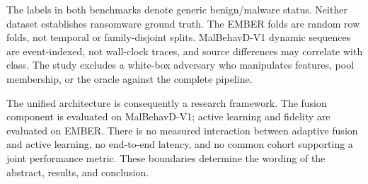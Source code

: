 The labels in both benchmarks denote generic benign/malware status. Neither
dataset establishes ransomware ground truth. The EMBER folds are random row
folds, not temporal or family-disjoint splits. MalBehavD-V1 dynamic sequences are
event-indexed, not wall-clock traces, and source differences may correlate with
class. The study excludes a white-box adversary who manipulates features, pool
membership, or the oracle against the complete pipeline.

The unified architecture is consequently a research framework. The fusion
component is evaluated on MalBehavD-V1; active learning and fidelity are
evaluated on EMBER. There is no measured interaction between adaptive fusion and
active learning, no end-to-end latency, and no common cohort supporting a joint
performance metric. These boundaries determine the wording of the abstract,
results, and conclusion.
